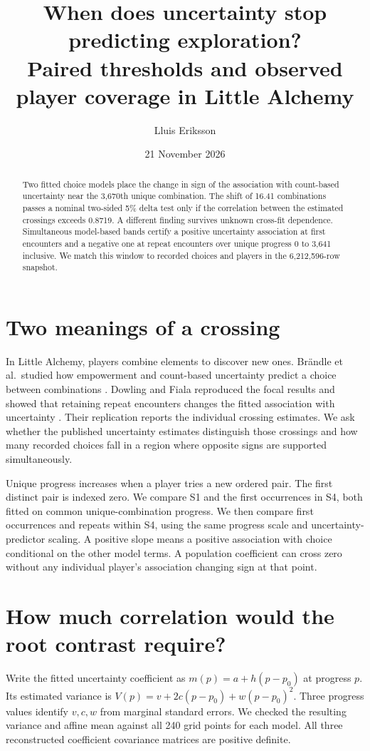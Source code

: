 \documentclass[11pt]{article}
\title{When does uncertainty stop predicting exploration?\\Paired thresholds and observed player coverage in Little Alchemy}
\author{Lluis Eriksson}\date{21 November 2026}
\begin{document}
\maketitle
\begin{abstract}
Two fitted choice models place the change in sign of the association with count-based uncertainty near the 3,670th unique combination. The shift of 16.41 combinations passes a nominal two-sided 5\% delta test only if the correlation between the estimated crossings exceeds 0.8719. A different finding survives unknown cross-fit dependence. Simultaneous model-based bands certify a positive uncertainty association at first encounters and a negative one at repeat encounters over unique progress 0 to 3,641 inclusive. We match this window to recorded choices and players in the 6,212,596-row snapshot.
\end{abstract}
\section{Two meanings of a crossing}
In Little Alchemy, players combine elements to discover new ones. Br\"andle et al.\ studied how empowerment and count-based uncertainty predict a choice between combinations \cite{orig}. Dowling and Fiala reproduced the focal results and showed that retaining repeat encounters changes the fitted association with uncertainty \cite{rep}. Their replication reports the individual crossing estimates. We ask whether the published uncertainty estimates distinguish those crossings and how many recorded choices fall in a region where opposite signs are supported simultaneously.

Unique progress increases when a player tries a new ordered pair. The first distinct pair is indexed zero. We compare S1 and the first occurrences in S4, both fitted on common unique-combination progress. We then compare first occurrences and repeats within S4, using the same progress scale and uncertainty-predictor scaling. A positive slope means a positive association with choice conditional on the other model terms. A population coefficient can cross zero without any individual player's association changing sign at that point.
\newpage
\section{How much correlation would the root contrast require?}
Write the fitted uncertainty coefficient as $m(p)=a+h(p-p_0)$ at progress $p$. Its estimated variance is $V(p)=v+2c(p-p_0)+w(p-p_0)^2$. Three progress values identify $v,c,w$ from marginal standard errors. We checked the resulting variance and affine mean against all 240 grid points for each model. All three reconstructed coefficient covariance matrices are positive definite.
\end{document}

